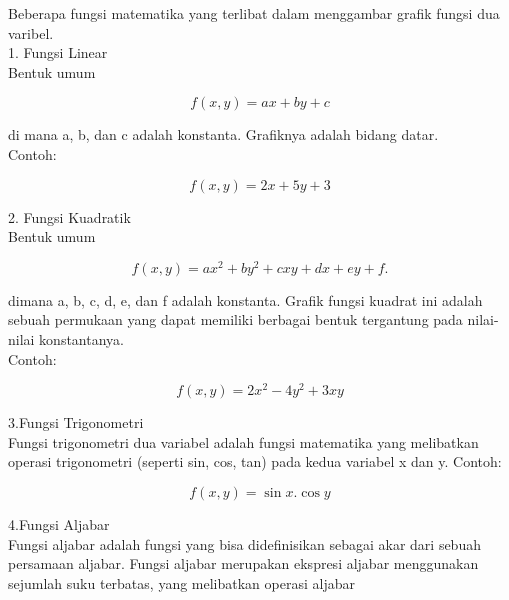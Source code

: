 \documentclass[a4paper,10pt]{article}
\begin{document}
\begin{eulernotebook}
\begin{eulercomment}
\begin{eulercomment}
\begin{eulercomment}
Beberapa fungsi matematika yang terlibat dalam menggambar grafik
fungsi dua varibel.\\
1. Fungsi Linear\\
Bentuk umum\\
\end{eulercomment}
\begin{eulerformula}
\[
f(x, y) = ax + by + c
\]
\end{eulerformula}
\begin{eulercomment}
di mana a, b, dan c adalah konstanta. Grafiknya adalah bidang datar.\\
Contoh:\\
\end{eulercomment}
\begin{eulerformula}
\[
f(x,y)=2x+5y+3
\]
\end{eulerformula}
\begin{eulercomment}
2. Fungsi Kuadratik\\
Bentuk umum\\
\end{eulercomment}
\begin{eulerformula}
\[
f(x, y) = ax^2 + by^2 + cxy + dx + ey + f.
\]
\end{eulerformula}
\begin{eulercomment}
dimana a, b, c, d, e, dan f adalah konstanta. Grafik fungsi kuadrat
ini adalah sebuah permukaan yang dapat memiliki berbagai bentuk
tergantung pada nilai-nilai konstantanya.\\
Contoh:\\
\end{eulercomment}
\begin{eulerformula}
\[
f(x,y)=2x^2-4y^2+3xy
\]
\end{eulerformula}
\begin{eulercomment}
3.Fungsi Trigonometri\\
Fungsi trigonometri dua variabel adalah fungsi matematika yang
melibatkan operasi trigonometri (seperti sin, cos, tan) pada kedua
variabel x dan y. Contoh:\\
\end{eulercomment}
\begin{eulerformula}
\[
f(x,y)=\sin{x}.\cos{y}
\]
\end{eulerformula}
\begin{eulercomment}
4.Fungsi Aljabar\\
Fungsi aljabar adalah fungsi yang bisa didefinisikan sebagai akar dari
sebuah persamaan aljabar. Fungsi aljabar merupakan ekspresi aljabar
menggunakan sejumlah suku terbatas, yang melibatkan operasi aljabar

\end{eulercomment}
\end{eulercomment}
\end{eulercomment}
\end{eulernotebook}
\end{document}
